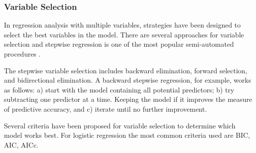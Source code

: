 \documentclass[12pt,english]{report}
\begin{document}

\subsubsection{Variable Selection}
In regression analysis with multiple variables, strategies have been designed
to select the best variables in the model. There are several approaches for
variable selection and stepwise regression is one of the most popular
semi-automated procedures \citep{Han2011}.


The stepwise variable selection includes backward elimination, forward selection, and
bidirectional elimination. A backward stepwise regression, for example, works
as follows: a) start with the model containing all potential predictors; b) try
subtracting one predictor at a time. Keeping the model if it improves the
measure of predictive accuracy, and c) iterate until no further improvement.

Several criteria have been proposed for variable selection to determine which
model works best. For logistic regression the most common criteria used  are
BIC, AIC, AICc.  
\end{document}
